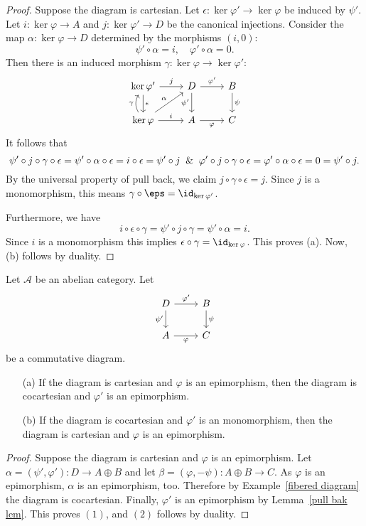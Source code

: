 \begin{proof}
Suppose the diagram is cartesian. Let $\epsilon:\ker\varphi'\to\ker\varphi$ be induced by $\psi'$. Let $i:\ker\varphi\to A$ and $j:\ker\varphi'\to D$ be the canonical injections. Consider the map $\alpha:\ker\varphi\to D$ determined by the morphisms $(i,0)$:
\[\psi'\circ\alpha=i,\quad \varphi'\circ\alpha=0.\]
Then there is an induced morphism $\gamma:\ker\varphi\to\ker\varphi'$:
\[\begin{tikzcd}
\ker\varphi'\ar[r,"j"]\ar[d,"\epsilon"]&D\ar[d,swap,"\psi'"]\ar[r,"\varphi'"]&B\ar[d,"\psi"]\\
\ker\varphi\ar[r,"i"]\ar[ru,"\alpha"]\ar[u,bend left=30pt,"\gamma"]&A\ar[r,swap,"\varphi"]&C
\end{tikzcd}\]
It follows that
\[\psi'\circ j\circ\gamma\circ\epsilon=\psi'\circ\alpha\circ\epsilon=i\circ\epsilon=\psi'\circ j\And\varphi'\circ j\circ\gamma\circ\epsilon=\varphi'\circ\alpha\circ\epsilon=0=\psi'\circ j.\]
By the universal property of pull back, we claim $j\circ\gamma\circ\epsilon=j$. Since $j$ is a monomorphism, this means $\gamma\circ\eps=\id_{\ker\varphi'}$.\par
Furthermore, we have 
\[i\circ\epsilon\circ\gamma=\psi'\circ j\circ\gamma=\psi'\circ\alpha=i.\]
Since $i$ is a monomorphism this implies $\epsilon\circ\gamma=\id_{\ker\varphi}$. This proves (a). Now, (b) follows by duality.
\end{proof}
\begin{lemma}
Let $\mathcal{A}$ be an abelian category. Let
\[\begin{tikzcd}
D\ar[d,swap,"\psi'"]\ar[r,"\varphi'"]&B\ar[d,"\psi"]\\
A\ar[r,swap,"\varphi"]&C
\end{tikzcd}\]
be a commutative diagram.
\begin{enumerate}
\item[(a)] If the diagram is cartesian and $\varphi$ is an epimorphism, then the diagram is cocartesian and $\varphi'$ is an epimorphism.
\item[(b)] If the diagram is cocartesian and $\varphi'$ is an monomorphism, then the diagram is cartesian and $\varphi$ is an epimorphism.
\end{enumerate}
\end{lemma}
\begin{proof}
Suppose the diagram is cartesian and $\varphi$ is an epimorphism. Let $\alpha=(\psi',\varphi'):D\to A\oplus B$ and let $\beta=(\varphi,-\psi):A\oplus B\to C$. As $\varphi$ is an epimorphism, $\alpha$ is an epimorphism, too. Therefore by Example~\ref{fibered diagram} the diagram is cocartesian. Finally, $\varphi'$ is an epimorphism by Lemma~\ref{pull bak lem}. This proves $(1)$, and $(2)$ follows by duality.
\end{proof}

